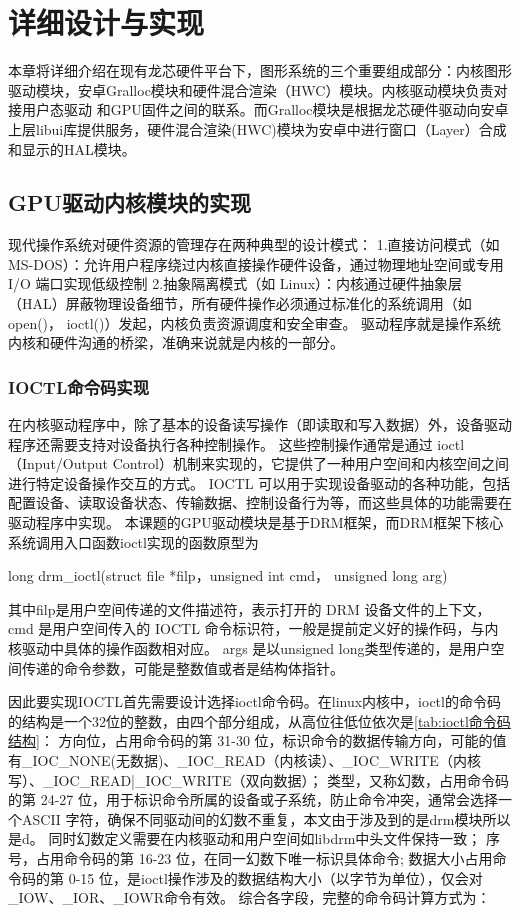 
\chapter{详细设计与实现}
本章将详细介绍在现有龙芯硬件平台下，图形系统的三个重要组成部分：内核图形驱动模块，安卓Gralloc模块和硬件混合渲染（HWC）模块。内核驱动模块负责对接用户态驱动
和GPU固件之间的联系。而Gralloc模块是根据龙芯硬件驱动向安卓上层libui库提供服务，硬件混合渲染(HWC)模块为安卓中进行窗口（Layer）合成和显示的HAL模块。

\section{GPU驱动内核模块的实现}
现代操作系统对硬件资源的管理存在两种典型的设计模式\cite{马超2015linux}：
1.直接访问模式​（如 MS-DOS）：允许用户程序绕过内核直接操作硬件设备，通过物理地址空间或专用 I/O 端口实现低级控制
2.抽象隔离模式​（如 Linux）：内核通过硬件抽象层（HAL）屏蔽物理设备细节，所有硬件操作必须通过标准化的系统调用\cite{刘大同2016vxworks}（如 open()， ioctl()）发起，内核负责资源调度和安全审查。
驱动程序就是操作系统内核和硬件沟通的桥梁，准确来说就是内核的一部分。

\subsection{IOCTL命令码实现}
\label{sec:IOCTL命令码设计}
在内核驱动程序中，除了基本的设备读写操作（即读取和写入数据）外，设备驱动程序还需要支持对设备执行各种控制操作。
这些控制操作通常是通过 ioctl（Input/Output Control）机制来实现的，它提供了一种用户空间和内核空间之间进行特定设备操作交互的方式。
IOCTL 可以用于实现设备驱动的各种功能，包括配置设备、读取设备状态、传输数据、控制设备行为等，而这些具体的功能需要在驱动程序中实现。
本课题的GPU驱动模块是基于DRM框架，而DRM框架下核心系统调用入口函数ioctl实现的函数原型为

long drm\_ioctl(struct file *filp，unsigned int cmd， unsigned long arg)

其中filp是用户空间传递的文件描述符，表示打开的 DRM 设备文件的上下文，cmd 是用户空间传入的 IOCTL 命令标识符，一般是提前定义好的操作码，与内核驱动中具体的操作函数相对应。
args 是以unsigned long类型传递的，是用户空间传递的命令参数，可能是整数值或者是结构体指针。

因此要实现IOCTL首先需要设计选择ioctl命令码。在linux内核中，ioctl的命令码的结构是一个32位的整数，由四个部分组成，从高位往低位依次是\ref{tab:ioctl命令码结构}：
方向位，占用命令码的第 ​31-30 位​，标识命令的数据传输方向，可能的值有\_IOC\_NONE(无数据)、\_IOC\_READ（内核读）、\_IOC\_WRITE（内核写）、\_IOC\_READ|\_IOC\_WRITE（双向数据）；
类型，又称幻数，占用命令码的第 ​24-27 位，用于标识命令所属的设备或子系统，防止命令冲突，通常会选择一个ASCII 字符，确保不同驱动间的幻数不重复，本文由于涉及到的是drm模块所以是d。
同时幻数定义需要在内核驱动和用户空间如libdrm中头文件保持一致；
序号，占用命令码的第 ​16-23 位，在同一幻数下唯一标识具体命令;
数据大小占用命令码的第 ​0-15 位，是ioctl操作涉及的数据结构大小（以字节为单位），仅会对\_IOW、\_IOR、\_IOWR命令有效。
综合各字段，完整的命令码计算方式为：

